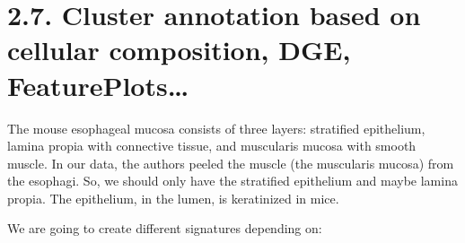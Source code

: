 \documentclass[
  letterpaper,
  DIV=11,
  numbers=noendperiod]{scrreprt}
\begin{document}
\section{2.7. Cluster annotation based on cellular composition, DGE,
FeaturePlots\ldots{}}\label{cluster-annotation-based-on-cellular-composition-dge-featureplots}

The mouse esophageal mucosa consists of three layers: stratified
epithelium, lamina propia with connective tissue, and muscularis mucosa
with smooth muscle. In our data, the authors peeled the muscle (the
muscularis mucosa) from the esophagi. So, we should only have the
stratified epithelium and maybe lamina propia. The epithelium, in the
lumen, is keratinized in mice.

We are going to create different signatures depending on:
\end{document}
